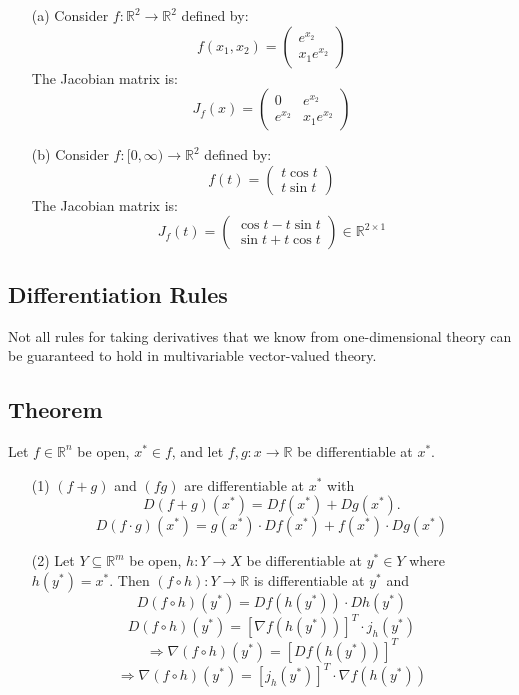 \documentclass{article}
\begin{document}
\begin{enumerate}
    \item[(a)] Consider \( f: \mathbb{R}^2 \rightarrow \mathbb{R}^2 \) defined by:
    \[
    f(x_1, x_2) = 
    \begin{pmatrix}
    e^{x_2} \\
    x_1 e^{x_2}
    \end{pmatrix}
    \]
    The Jacobian matrix is:
    \[
    J_f(x) = 
    \begin{pmatrix}
    0 & e^{x_2} \\
    e^{x_2} & x_1 e^{x_2}
    \end{pmatrix}
    \]
    
    \item[(b)] Consider \( f: [0, \infty) \rightarrow \mathbb{R}^2 \) defined by:
    \[
    f(t) = 
    \begin{pmatrix}
    t \cos t \\
    t \sin t
    \end{pmatrix}
    \]
    The Jacobian matrix is:
    \[
    J_f(t) = 
    \begin{pmatrix}
    \cos t - t \sin t \\
    \sin t + t \cos t
    \end{pmatrix}
    \in \mathbb{R}^{2 \times 1}
    \]
\end{enumerate}
\newpage
\subsection{Differentiation Rules}

Not all rules for taking derivatives that we know from one-dimensional theory can be guaranteed to hold in multivariable vector-valued theory.

\subsection*{Theorem}

Let \( f \in \mathbb{R}^n \) be open, \( x^* \in f \), and let \( f, g : x \rightarrow \mathbb{R} \) be differentiable at \( x^* \).

\begin{enumerate}
    \item[(1)] \( (f + g) \) and \( (fg) \) are differentiable at \( x^* \) with
    \[
    D(f + g)(x^*) = Df(x^*) + Dg(x^*).
    \]
    \[
    D(f \cdot g)(x^{*}) = g(x^{*}) \cdot Df(x^{*}) + f(x^{*}) \cdot Dg(x^{*})    
    \]
    \item[(2)] Let $Y \subseteq \mathbb{R}^{m}$ be open, $ h: Y \rightarrow X$ be differentiable at $y^{*} \in Y$ where $h(y^{*}) = x^{*}$. Then $(f \circ h) : Y \rightarrow \mathbb{R} $ is differentiable at $y^{*}$ and 
    \[
    D(f \circ h)(y^{*}) = Df(h(y^{*}))\cdot Dh(y^{*})
    \]
    \[
    D(f \circ h)(y^{*}) = [\nabla f(h(y^{*}))]^{T} \cdot j_h(y^{*})
    \]
    \[
    \Rightarrow \nabla(f \circ h)(y^*) = [Df(h(y^*))]^T 
    \]
    \[
    \Rightarrow \nabla(f \circ h)(y^*) = [j_h(y^*)]^T \cdot \nabla f(h(y^*))
    \]
\end{enumerate}
\end{document}

